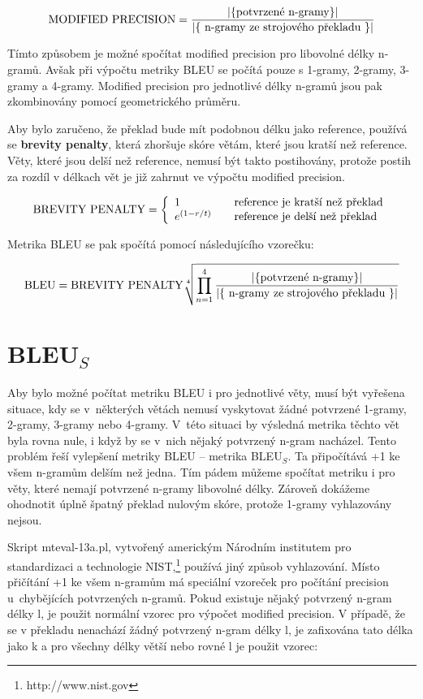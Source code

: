 $$ \text{MODIFIED PRECISION} = \frac{\lvert \lbrace \text{potvrzené \mbox{n-gramy}} \rbrace \rvert }{ \lvert \lbrace \text{ n-gramy ze strojového překladu } \rbrace \rvert } $$

Tímto způsobem je možné spočítat modified precision pro libovolné délky n-gramů.
Avšak při výpočtu metriky BLEU se počítá pouze s \mbox{1-gramy}, \mbox{2-gramy}, \mbox{3-gramy} a \mbox{4-gramy}.
Modified precision pro jednotlivé délky n-gramů jsou pak zkombinovány pomocí geometrického průměru.

Aby bylo zaručeno,
  že překlad bude mít podobnou délku jako reference,
  používá se \textbf{brevity penalty},
  která zhoršuje skóre větám, které jsou kratší než reference.
Věty, které jsou delší než reference,
  nemusí být takto postihovány,
  protože postih za rozdíl v délkach vět je již zahrnut ve výpočtu modified precision.

$$
\text{BREVITY PENALTY} = \left\{
	\begin{array}{l l}
		1 & \quad \text{reference je kratší než překlad} \\
		e^{(1-r/t)} & \quad \text{reference je delší než překlad}
	\end{array}
\right.
$$

Metrika BLEU se pak spočítá pomocí následujícího vzorečku:

$$ \text{BLEU} = \text{BREVITY PENALTY} \sqrt[4]{\prod_{n=1}^{4} \frac{\lvert \lbrace \text{potvrzené \mbox{n-gramy}} \rbrace \rvert }{ \lvert \lbrace \text{ n-gramy ze strojového překladu } \rbrace \rvert }} $$


\section{BLEU${}_S$}
Aby bylo možné počítat metriku BLEU i pro jednotlivé věty,
  musí být vyřešena situace,
  kdy se v~některých větách nemusí vyskytovat žádné potvrzené \mbox{1-gramy}, \mbox{2-gramy}, \mbox{3-gramy} nebo \mbox{4-gramy}.
V~této situaci by výsledná metrika těchto vět byla rovna nule,
  i když by se v~nich nějaký potvrzený \mbox{n-gram} nacházel.
Tento problém řeší vylepšení metriky BLEU -- metrika BLEU${}_S$. %
Ta připočítává +1 ke všem \mbox{n-gramům} delším než jedna.
Tím pádem můžeme spočítat metriku i pro věty,
  které nemají potvrzené \mbox{n-gramy} libovolné délky.
Zároveň dokážeme ohodnotit úplně špatný překlad nulovým skóre,
  protože 1-gramy vyhlazovány nejsou.

Skript mteval-13a.pl, %
  vytvořený americkým Národním institutem pro standardizaci a technologie NIST,\footnote{http://www.nist.gov}
  používá jiný způsob vyhlazování.
Místo přičítání +1 ke všem \mbox{n-gramům} má speciální vzoreček pro počítání precision u~chybějících potvrzených \mbox{n-gramů}.
Pokud existuje nějaký potvrzený \mbox{n-gram} délky l,
  je použit normální vzorec pro výpočet modified precision.
V případě, že se v překladu nenachází žádný potvrzený \mbox{n-gram} délky l,
  je zafixována tato délka jako k
  a pro všechny délky větší nebo rovné l je použit vzorec:


